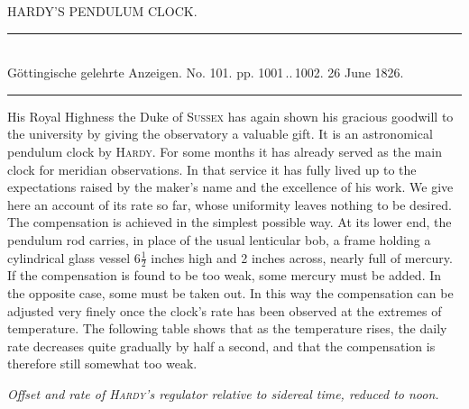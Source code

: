 \clearpage
{}
\hypertarget{native-458-hardy}{}
\begin{center}{\large HARDY’S PENDULUM CLOCK.}\end{center}

\begin{center}
\rule{0.55\linewidth}{0.4pt}\\[2pt]
Göttingische gelehrte Anzeigen. No. 101. pp. 1001\,..\,1002. 26 June 1826.\\[2pt]
\rule{0.55\linewidth}{0.4pt}
\end{center}

His Royal Highness the Duke of \textsc{Sussex} has again shown his gracious goodwill to the university by giving the observatory a valuable gift. It is an astronomical pendulum clock by \textsc{Hardy}. For some months it has already served as the main clock for meridian observations. In that service it has fully lived up to the expectations raised by the maker’s name and the excellence of his work. We give here an account of its rate so far, whose uniformity leaves nothing to be desired. The compensation is achieved in the simplest possible way. At its lower end, the pendulum rod carries, in place of the usual lenticular bob, a frame holding a cylindrical glass vessel $6\frac{1}{2}$ inches high and 2 inches across, nearly full of mercury. If the compensation is found to be too weak, some mercury must be added. In the opposite case, some must be taken out. In this way the compensation can be adjusted very finely once the clock’s rate has been observed at the extremes of temperature. The following table shows that as the temperature rises, the daily rate decreases quite gradually by half a second, and that the compensation is therefore still somewhat too weak.

\begin{center}
\emph{Offset and rate of \textup{\textsc{Hardy}}’s regulator relative to sidereal time, reduced to noon.}
\end{center}

